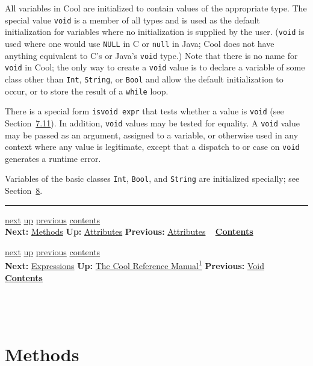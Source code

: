 \documentclass[]{article}
\begin{document}
All variables in Cool are initialized to contain values of the
appropriate type. The special value \texttt{void} is a member of all
types and is used as the default initialization for variables where no
initialization is supplied by the user. (\texttt{void} is used where one
would use \texttt{NULL} in C or \texttt{null} in Java; Cool does not
have anything equivalent to C's or Java's \texttt{void} type.) Note that
there is no name for \texttt{void} in Cool; the only way to create a
\texttt{void} value is to declare a variable of some class other than
\texttt{Int}, \texttt{String}, or \texttt{Bool} and allow the default
initialization to occur, or to store the result of a \texttt{while}
loop.

There is a special form \texttt{isvoid expr} that tests whether a value
is \texttt{void} (see Section~\href{node24.html\#sec-isvoid}{7.11}). In
addition, \texttt{void} values may be tested for equality. A
\texttt{void} value may be passed as an argument, assigned to a
variable, or otherwise used in any context where any value is
legitimate, except that a dispatch to or case on \texttt{void} generates
a runtime error.

Variables of the basic classes \texttt{Int}, \texttt{Bool}, and
\texttt{String} are initialized specially; see
Section~\href{node26.html\#sec-basic}{8}.

\begin{center}\rule{3in}{0.4pt}\end{center}

\href{node12.html}{next} \href{node10.html}{up}
\href{node10.html}{previous} \href{node1.html}{contents} \\
\textbf{Next:} \href{node12.html}{Methods} \textbf{Up:}
\href{node10.html}{Attributes} \textbf{Previous:}
\href{node10.html}{Attributes} ~ \textbf{\href{node1.html}{Contents}}

\href{node13.html}{next} \href{cool-manual.html}{up}
\href{node11.html}{previous} \href{node1.html}{contents} \\
\textbf{Next:} \href{node13.html}{Expressions} \textbf{Up:}
\href{cool-manual.html}{The Cool Reference Manual\textsuperscript{1}}
\textbf{Previous:} \href{node11.html}{Void} ~
\textbf{\href{node1.html}{Contents}} \\ \\

\section{\\ Methods}
\end{document}
